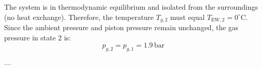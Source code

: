 The system is in thermodynamic equilibrium and isolated from the surroundings (no heat exchange). Therefore, the temperature \( T_{g,2} \) must equal \( T_{\text{EW},2} = 0^\circ\text{C} \). Since the ambient pressure and piston pressure remain unchanged, the gas pressure in state 2 is:  
\[
p_{g,2} = p_{g,1} = 1.9 \, \text{bar}
\]  

---